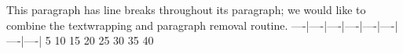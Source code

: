 This paragraph has line breaks
throughout its paragraph; we would
like to combine the textwrapping
and paragraph removal routine.
----|----|----|----|----|----|----|----|
   5   10   15   20   25   30   35   40